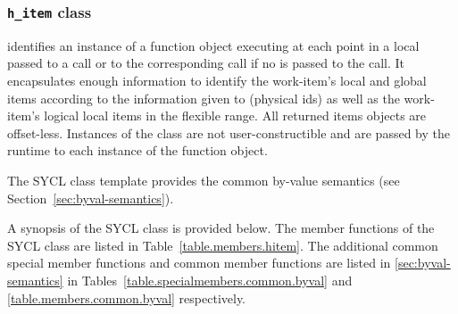 
\subsubsection{\texttt{h_item} class}
\label{hitem-class}

 identifies an instance of a  function object
executing at each point in a local  passed to a 
call or to the corresponding  call if no 
is passed to the  call.
It encapsulates enough information to identify the \gls{work-item}'s local and global \glspl{item}
according to the information given to  (physical ids)
as well as the \gls{work-item}'s logical local \glspl{item} in the flexible range.
All returned \glspl{item} objects are offset-less.
Instances of the  class are not
user-constructible and are passed by the runtime to each instance of the
function object.

The SYCL  class template provides the common by-value
semantics (see Section~\ref{sec:byval-semantics}).

A synopsis of the SYCL  class is provided below. The member functions of the SYCL  class are listed in Table~\ref{table.members.hitem}. The additional common special member functions and common member functions are listed in \ref{sec:byval-semantics} in Tables~\ref{table.specialmembers.common.byval} and \ref{table.members.common.byval} respectively.



